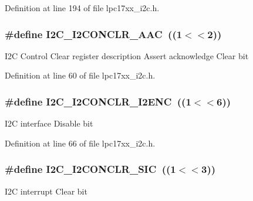 \-Definition at line 194 of file lpc17xx\-\_\-i2c.\-h.

\hypertarget{group___i2_c___private___macros_gaa13b19babb8442aa9047f8ecb92a908d}{
\subsubsection[{\-I2\-C\-\_\-\-I2\-C\-O\-N\-C\-L\-R\-\_\-\-A\-A\-C}]{\setlength{\rightskip}{0pt plus 5cm}\#define {\bf \-I2\-C\-\_\-\-I2\-C\-O\-N\-C\-L\-R\-\_\-\-A\-A\-C}~((1$<$$<$2))}}\label{group___i2_c___private___macros_gaa13b19babb8442aa9047f8ecb92a908d}
\-I2\-C \-Control \-Clear register description \-Assert acknowledge \-Clear bit 

\-Definition at line 60 of file lpc17xx\-\_\-i2c.\-h.

\hypertarget{group___i2_c___private___macros_ga92718ac11d46f6e32d526749f09d01b2}{
\subsubsection[{\-I2\-C\-\_\-\-I2\-C\-O\-N\-C\-L\-R\-\_\-\-I2\-E\-N\-C}]{\setlength{\rightskip}{0pt plus 5cm}\#define {\bf \-I2\-C\-\_\-\-I2\-C\-O\-N\-C\-L\-R\-\_\-\-I2\-E\-N\-C}~((1$<$$<$6))}}\label{group___i2_c___private___macros_ga92718ac11d46f6e32d526749f09d01b2}
\-I2\-C interface \-Disable bit 

\-Definition at line 66 of file lpc17xx\-\_\-i2c.\-h.

\hypertarget{group___i2_c___private___macros_ga36753112210a8c33d566b572b63b753b}{
\subsubsection[{\-I2\-C\-\_\-\-I2\-C\-O\-N\-C\-L\-R\-\_\-\-S\-I\-C}]{\setlength{\rightskip}{0pt plus 5cm}\#define {\bf \-I2\-C\-\_\-\-I2\-C\-O\-N\-C\-L\-R\-\_\-\-S\-I\-C}~((1$<$$<$3))}}\label{group___i2_c___private___macros_ga36753112210a8c33d566b572b63b753b}
\-I2\-C interrupt \-Clear bit 

